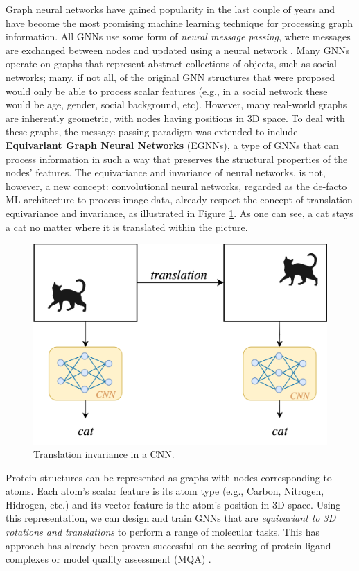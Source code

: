 Graph neural networks have gained popularity in the last couple of years and have become the most promising machine learning technique for processing graph information. All GNNs use some form of \textit{neural message passing}, where messages are exchanged between nodes and updated using a neural network \citep{gilmer2017neural}. Many GNNs operate on graphs that represent abstract collections of objects, such as social networks; many, if not all, of the original GNN structures that were proposed would only be able to process scalar features (e.g., in a social network these would be age, gender, social background, etc). However, many real-world graphs are inherently geometric, with nodes having positions in 3D space. To deal with these graphs, the message-passing paradigm was extended to include \textbf{Equivariant Graph Neural Networks} (EGNNs), a type of GNNs that can process information in such a way that preserves the structural properties of the nodes' features. The equivariance and invariance of neural networks, is not, however, a new concept: convolutional neural networks, regarded as the de-facto ML architecture to process image data, already respect the concept of translation equivariance and invariance, as illustrated in Figure \ref{cnn-invariance}. As one can see, a cat stays a cat no matter where it is translated within the picture. 
\begin{figure}
    \centering
    \includegraphics[scale=0.6]{masters-report/figures/cnn-invariance.png}
    \caption{Translation invariance in a CNN.}
    \label{cnn-invariance}
\end{figure}

Protein structures can be represented as graphs with nodes corresponding to atoms. Each atom's scalar feature is its atom type (e.g., Carbon, Nitrogen, Hidrogen, etc.) and its vector feature is the atom's position in 3D space. Using this representation, we can design and train GNNs that are  \textit{equivariant to 3D rotations and translations} to perform a range of molecular tasks. This has approach has already been proven successful on the scoring of protein-ligand complexes \cite{egnn-application-1} or model quality assessment (MQA) \cite{gvp1}.

